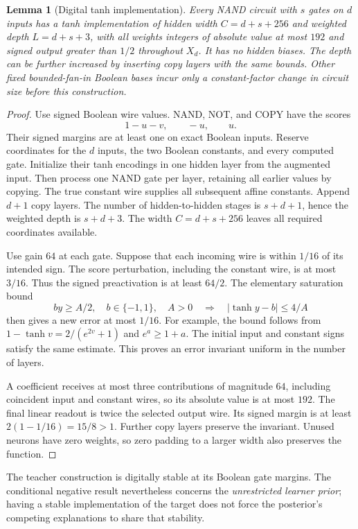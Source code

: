 \documentclass[11pt]{article}
\newtheorem{lemma}[theorem]{Lemma}
\theoremstyle{remark}\newtheorem{remark}[theorem]{Remark}
\begin{document}
\begin{lemma}[Digital tanh implementation]\label{lem:teacher}
Every NAND circuit with $s$ gates on $d$ inputs has a tanh implementation
of hidden width $C=d+s+256$ and weighted depth $L=d+s+3$, with all
weights integers of absolute value at most $192$ and signed output
greater than $1/2$ throughout $X_d$. It has no hidden biases. The depth
can be further increased by inserting copy layers with the same bounds.
Other fixed bounded-fan-in Boolean bases incur only a constant-factor
change in circuit size before this construction.
\end{lemma}
\begin{proof}
Use signed Boolean wire values. NAND, NOT, and COPY have the scores
\[
 1-u-v,\qquad -u,\qquad u.
\]
Their signed margins are at least one on exact Boolean inputs.
Reserve coordinates for the $d$ inputs, the two Boolean constants,
and every computed gate. Initialize their tanh encodings in one hidden
layer from the augmented input. Then process one NAND gate per layer,
retaining all earlier values by copying. The true constant wire supplies
all subsequent affine constants. Append $d+1$ copy layers. The number of
hidden-to-hidden stages is $s+d+1$, hence the weighted depth is $s+d+3$.
The width $C=d+s+256$ leaves all required coordinates available.

Use gain $64$ at each gate. Suppose that each incoming wire is within
$1/16$ of its intended sign. The score perturbation, including the
constant wire, is at most $3/16$. Thus the signed preactivation is at
least $64/2$. The elementary saturation bound
\[
 by\ge A/2,\quad b\in\{-1,1\},\quad A>0
 \quad\Longrightarrow\quad |\tanh y-b|\le4/A
\]
then gives a new error at most $1/16$. For example, the bound follows
from $1-\tanh v=2/(e^{2v}+1)$ and $e^a\ge1+a$.
The initial input and constant signs satisfy the same estimate.
This proves an error invariant uniform in the number of layers.

A coefficient receives at most three contributions of magnitude $64$,
including coincident input and constant wires, so its absolute value is
at most $192$. The final linear readout is twice the selected output
wire. Its signed margin is at least $2(1-1/16)=15/8>1$.
Further copy layers preserve the invariant. Unused neurons have zero
weights, so zero padding to a larger width also preserves the function.
\end{proof}

The teacher construction is digitally stable at its Boolean gate
margins. The conditional negative result nevertheless concerns the
\emph{unrestricted learner prior}; having a stable implementation of the
target does not force the posterior's competing explanations to share
that stability.
\end{document}
